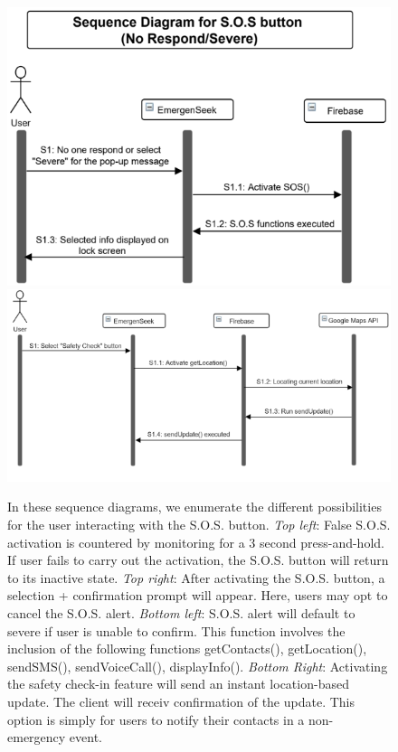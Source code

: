\documentclass[10pt, a4paper]{article}
\begin{document}
\begin{figure}[H]
{  	\includegraphics[scale=0.6]{diagrams/sequence-5c.png}
  	\includegraphics[scale=0.7]{diagrams/sequence-5d.png}
   } 
  \caption{In these sequence diagrams, we enumerate the different possibilities for the user interacting with the S.O.S. button. \emph{Top left}: False S.O.S. activation is countered by monitoring for a 3 second press-and-hold. If user fails to carry out the activation, the S.O.S. button will return to its inactive state. \emph{Top right}: After activating the S.O.S. button, a selection + confirmation prompt will appear. Here, users may opt to cancel the S.O.S. alert. \emph{Bottom left}: S.O.S. alert will default to severe if user is unable to confirm. This function involves the inclusion of the following functions getContacts(), getLocation(), sendSMS(), sendVoiceCall(), displayInfo(). \emph{Bottom Right}: Activating the safety check-in feature will send an instant location-based update. The client will receiv confirmation of the update. This option is simply for users to notify their contacts in a non-emergency event.}
\end{figure}
\end{document}
